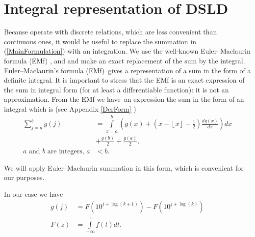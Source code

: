 \documentclass[titlepage,fleqn]{article}%
\begin{document}
\section{Integral representation of DSLD}%

\label{InerPesent}%


Because operate with discrete relations, which are less convenient than
continuous ones, it would be useful to replace the summation in
(\ref{MainFormulation}) with an integration. We use the well-known
Euler--Maclaurin formula (EMf)%
\cite{knuth},\cite{wabramowitzstegun}
and \cite{knuth2}
and make an exact replacement of the sum by the integral.%
\label{EulerMaclaurin}%
Euler--Maclaurin's formula (EMf)\ gives a representation of a sum in the form
of a definite integral. It is important to stress that the EMf is an exact
expression of the sum in integral form (for at least a differentiable
function): it is not an approximation. From the EMf we have\bigskip\ an
expression the sum in the form of an integral which is (see Appendix
\ref{DerForm}%
)\
\begin{align}%
{\displaystyle\sum\limits_{j=a}^{b}}
g(j)  &  =%
{\displaystyle\int\limits_{x=a}^{b}}
\left(  g(x)+\left(  x-\left\lfloor x\right\rfloor -\frac{1}{2}\right)
\frac{dg(x)}{dx}\right)  dx\label{EMF00}\\
&  +\frac{g(b)}{2}+\frac{g(a)}{2},\\
a\text{ and }b\text{ are integers, }a  &  <b.\nonumber
\end{align}


We will apply Euler--Maclaurin summation in this form, which is convenient for
our purposes.

In our case we have%
\begin{align*}
g(j)  &  =F(10^{j+\log(k+1)})-F(10^{j+\log(k)})\\
F(z)  &  =%
{\displaystyle\int\limits_{-\infty}^{z}}
f(t)dt.
\end{align*}
\end{document}

